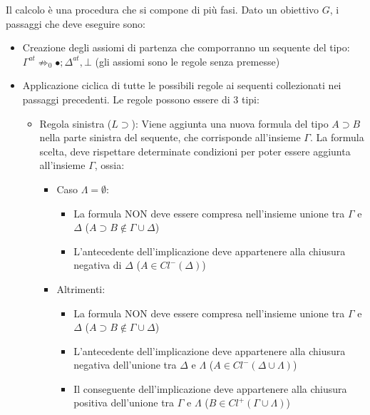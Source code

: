 \documentclass[\main/tesi.tex]{subfiles}
\begin{document}
Il calcolo è una procedura che si compone di più fasi. Dato un obiettivo $G$, i passaggi che deve eseguire sono:
\begin{itemize}
    \item Creazione degli assiomi di partenza che comporranno un sequente del tipo: $\Gamma^{at} \not\Rightarrow_0 \bullet; \Delta^{at}, \bot$ (gli assiomi sono le regole senza premesse)
    \item Applicazione ciclica di tutte le possibili regole ai sequenti collezionati nei passaggi precedenti. Le regole possono essere di 3 tipi:
          \begin{itemize}
              \item Regola sinistra ($L\supset$): Viene aggiunta una nuova formula del tipo $A \supset B$ nella parte sinistra del sequente, che corrisponde all'insieme $\Gamma$. La formula scelta, deve rispettare determinate condizioni per poter essere aggiunta all'insieme $\Gamma$, ossia:
                    \begin{itemize}
                        \item Caso $\Lambda = \emptyset$:
                              \begin{itemize}
                                  \item La formula NON deve essere compresa nell'insieme unione tra $\Gamma$ e $\Delta$ ($A \supset B \notin \Gamma \cup \Delta$)
                                  \item L'antecedente dell'implicazione deve appartenere alla chiusura negativa di $\Delta$ ($A \in Cl^{-}(\Delta)$)
                              \end{itemize}
                        \item Altrimenti:
                              \begin{itemize}
                                  \item La formula NON deve essere compresa nell'insieme unione tra $\Gamma$ e $\Delta$ ($A \supset B \notin \Gamma \cup \Delta$)
                                  \item L'antecedente dell'implicazione deve appartenere alla chiusura negativa dell'unione tra $\Delta$ e $\Lambda$ ($A \in Cl^{-}(\Delta \cup \Lambda)$)
                                  \item Il conseguente dell'implicazione deve appartenere alla chiusura positiva dell'unione tra $\Gamma$ e $\Lambda$ ($B \in Cl^{+}(\Gamma \cup \Lambda)$)
                              \end{itemize}

\end{itemize}
\end{itemize}
\end{itemize}
\end{document}
